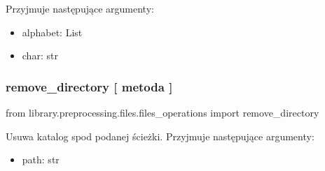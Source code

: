Przyjmuje następujące argumenty:
\begin{itemize}
	\item alphabet: List
	\item char: str
\end{itemize}

\subsubsection{remove\_directory [ metoda ] }
\begin{import}
from library.preprocessing.files.files_operations import remove_directory
\end{import}

Usuwa katalog spod podanej ścieżki.
Przyjmuje następujące argumenty:
\begin{itemize}
	\item path: str
\end{itemize}

